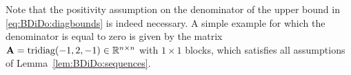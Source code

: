 Note that the positivity assumption on the denominator of the upper bound in
\eqref{eq:BDiDo:diagbounds} is indeed necessary. A simple example for which the
denominator is equal to zero is given by the matrix
$\mathbf{A}=\textrm{tridiag}(-1,2,-1) \in {\mathbb R}^{n\times n}$ with $1\times 1$
blocks, which satisfies all assumptions of Lemma~\ref{lem:BDiDo:sequences}.

%
%

